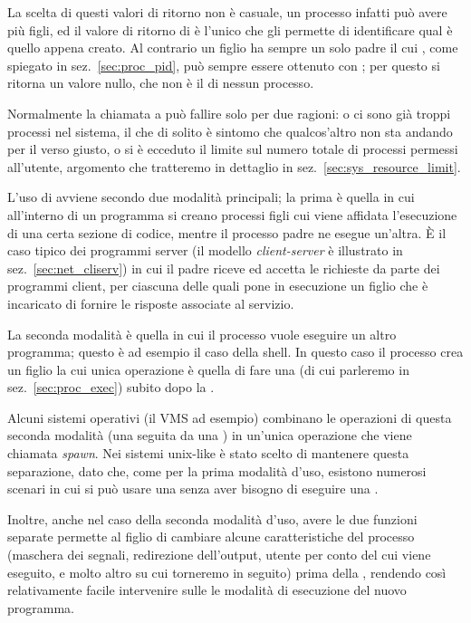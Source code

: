 La scelta di questi valori di ritorno non è casuale, un processo infatti può
avere più figli, ed il valore di ritorno di  è l'unico che gli
permette di identificare qual è quello appena creato. Al contrario un figlio
ha sempre un solo padre il cui , come spiegato in
sez.~\ref{sec:proc_pid}, può sempre essere ottenuto con ; per
questo si ritorna un valore nullo, che non è il  di nessun processo.

Normalmente la chiamata a  può fallire solo per due ragioni: o ci
sono già troppi processi nel sistema, il che di solito è sintomo che
qualcos'altro non sta andando per il verso giusto, o si è ecceduto il limite
sul numero totale di processi permessi all'utente, argomento che tratteremo in
dettaglio in sez.~\ref{sec:sys_resource_limit}.

L'uso di  avviene secondo due modalità principali; la prima è
quella in cui all'interno di un programma si creano processi figli cui viene
affidata l'esecuzione di una certa sezione di codice, mentre il processo padre
ne esegue un'altra. È il caso tipico dei programmi server (il modello
\textit{client-server} è illustrato in sez.~\ref{sec:net_cliserv}) in cui il
padre riceve ed accetta le richieste da parte dei programmi client, per
ciascuna delle quali pone in esecuzione un figlio che è incaricato di fornire
le risposte associate al servizio.

La seconda modalità è quella in cui il processo vuole eseguire un altro
programma; questo è ad esempio il caso della shell. In questo caso il processo
crea un figlio la cui unica operazione è quella di fare una  (di
cui parleremo in sez.~\ref{sec:proc_exec}) subito dopo la .

Alcuni sistemi operativi (il VMS ad esempio) combinano le operazioni di questa
seconda modalità (una  seguita da una ) in un'unica
operazione che viene chiamata \textit{spawn}. Nei sistemi unix-like è stato
scelto di mantenere questa separazione, dato che, come per la prima modalità
d'uso, esistono numerosi scenari in cui si può usare una  senza
aver bisogno di eseguire una . 

Inoltre, anche nel caso della seconda modalità d'uso, avere le due funzioni
separate permette al figlio di cambiare alcune caratteristiche del processo
(maschera dei segnali, redirezione dell'output, utente per conto del cui viene
eseguito, e molto altro su cui torneremo in seguito) prima della ,
rendendo così relativamente facile intervenire sulle le modalità di esecuzione
del nuovo programma.

